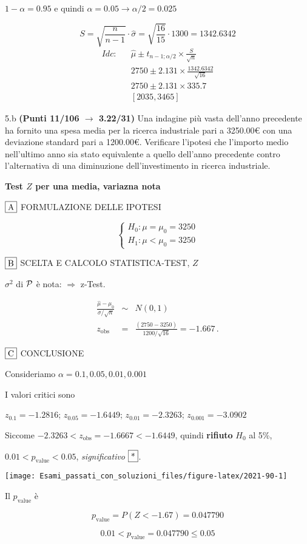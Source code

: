 \documentclass[
  11pt,
]{book}
\theoremstyle{mytheoremstyle}
\theoremstyle{mydefstyle}
\newenvironment{sol}
  {
  \begin{tcolorbox}[enhanced,breakable,arc=0.1mm,boxrule=1pt,colback=white,colframe=iblue,
  title=\bf \fontfamily{lmss}\selectfont \hspace{.5 cm} Soluzione,drop fuzzy shadow]

}{
\end{tcolorbox}
  }
\begin{document}
\(1-\alpha =0.95\) e quindi \(\alpha=0.05\rightarrow \alpha/2=0.025\)

\[
      S  =\sqrt{\frac {n}{n-1}}\cdot\hat\sigma =
     \sqrt{\frac { 16 }{ 15 }}\cdot 1300 = 1342.6342 
\]
\begin{eqnarray*}
  Idc: & &  \hat\mu \pm  t_{n-1;\alpha/2} \times \frac{S}{\sqrt{n}} \\
     & &  2750 \pm  2.131 \times \frac{ 1342.6342 }{\sqrt{ 16 }} \\
     & &  2750 \pm  2.131 \times  335.7 \\
     & & [ 2035 ,  3465 ]
\end{eqnarray*}

5.b \textbf{(Punti 11/106 \(\rightarrow\) 3.22/31)} Una indagine più vasta dell'anno precedente
ha fornito una spesa media per la ricerca industriale pari a
3250.00€ con una deviazione standard pari a 1200.00€.
Verificare l'ipotesi
che l'importo medio nell'ultimo anno sia stato equivalente a
quello dell'anno precedente contro l'alternativa di una
diminuzione dell'investimento in ricerca industriale.

\begin{sol}
\textbf{Test \(Z\) per una media, variazna nota}

\(\fbox{A}\) FORMULAZIONE DELLE IPOTESI

\[\begin{cases}
   H_0: \mu = \mu_0=3250 \\
   H_1: \mu < \mu_0=3250 
   \end{cases}\]

\(\fbox{B}\) SCELTA E CALCOLO STATISTICA-TEST, \(Z\)

\(\sigma^{2}\) di \(\cal{P}\) è nota: \(\Rightarrow\) z-Test.

\begin{eqnarray*}
   \frac{\hat\mu - \mu_{0}} {\sigma/\sqrt{n}}&\sim&N(0,1)\\
   z_{\text{obs}}
   &=& \frac{ ( 2750 -  3250 )} { 1200 /\sqrt{ 16 }}
   =   -1.667 \, .
   \end{eqnarray*}

\(\fbox{C}\) CONCLUSIONE

Consideriamo \(\alpha=0.1, 0.05, 0.01, 0.001\)

I valori critici sono

\(z_{0.1}=-1.2816\); \(z_{0.05}=-1.6449\); \(z_{0.01}=-2.3263\); \(z_{0.001}=-3.0902\)

Siccome \(-2.3263<z_\text{obs}=-1.6667<-1.6449\), quindi \textbf{rifiuto} \(H_0\) al 5\%,

\(0.01<p_\text{value}<0.05\), \emph{significativo} \(\fbox{*}\).

\begin{center}\texttt{[image: Esami\_passati\_con\_soluzioni\_files/figure-latex/2021-90-1]} \end{center}

Il \(p_{\text{value}}\) è

\[ p_{\text{value}} = P(Z<-1.67)=0.047790 \]

\[
 0.01 < p_\text{value}= 0.047790 \leq 0.05 
\]

\end{sol}
\end{document}
